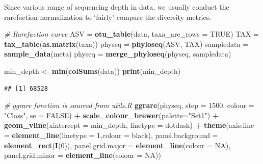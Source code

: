 \documentclass[
]{article}
\newenvironment{Shaded}{\begin{snugshade}}{\end{snugshade}}
\newcommand{\AttributeTok}[1]{\textcolor[rgb]{0.13,0.29,0.53}{#1}}
\newcommand{\CommentTok}[1]{\textcolor[rgb]{0.56,0.35,0.01}{\textit{#1}}}
\newcommand{\ConstantTok}[1]{\textcolor[rgb]{0.56,0.35,0.01}{#1}}
\newcommand{\DecValTok}[1]{\textcolor[rgb]{0.00,0.00,0.81}{#1}}
\newcommand{\FunctionTok}[1]{\textcolor[rgb]{0.13,0.29,0.53}{\textbf{#1}}}
\newcommand{\NormalTok}[1]{#1}
\newcommand{\OtherTok}[1]{\textcolor[rgb]{0.56,0.35,0.01}{#1}}
\newcommand{\SpecialCharTok}[1]{\textcolor[rgb]{0.81,0.36,0.00}{\textbf{#1}}}
\newcommand{\StringTok}[1]{\textcolor[rgb]{0.31,0.60,0.02}{#1}}
\begin{document}
Since various range of sequencing depth in data, we usually conduct the
rarefaction normalization to `fairly' compare the diversity metrics.

\begin{Shaded}
\begin{Highlighting}[]
\CommentTok{\# Rarefaction curve}
\NormalTok{ASV }\OtherTok{=} \FunctionTok{otu\_table}\NormalTok{(data, }\AttributeTok{taxa\_are\_rows =} \ConstantTok{TRUE}\NormalTok{)}
\NormalTok{TAX }\OtherTok{=} \FunctionTok{tax\_table}\NormalTok{(}\FunctionTok{as.matrix}\NormalTok{(taxa))}
\NormalTok{physeq }\OtherTok{=} \FunctionTok{phyloseq}\NormalTok{(ASV, TAX)}
\NormalTok{sampledata }\OtherTok{=} \FunctionTok{sample\_data}\NormalTok{(meta)}
\NormalTok{physeq }\OtherTok{=} \FunctionTok{merge\_phyloseq}\NormalTok{(physeq, sampledata)}

\NormalTok{min\_depth }\OtherTok{\textless{}{-}} \FunctionTok{min}\NormalTok{(}\FunctionTok{colSums}\NormalTok{(data))}
\FunctionTok{print}\NormalTok{(min\_depth)}
\end{Highlighting}
\end{Shaded}

\begin{verbatim}
## [1] 68528
\end{verbatim}

\begin{Shaded}
\begin{Highlighting}[]
\CommentTok{\# ggrare function is sourced from utils.R}
\FunctionTok{ggrare}\NormalTok{(physeq, }\AttributeTok{step =} \DecValTok{1500}\NormalTok{, }\AttributeTok{colour =} \StringTok{"Class"}\NormalTok{, }\AttributeTok{se =} \ConstantTok{FALSE}\NormalTok{) }\SpecialCharTok{+}
  \FunctionTok{scale\_colour\_brewer}\NormalTok{(}\AttributeTok{palette=}\StringTok{"Set1"}\NormalTok{) }\SpecialCharTok{+}
  \FunctionTok{geom\_vline}\NormalTok{(}\AttributeTok{xintercept =}\NormalTok{ min\_depth, }\AttributeTok{linetype =} \StringTok{\textquotesingle{}dotdash\textquotesingle{}}\NormalTok{) }\SpecialCharTok{+} 
  \FunctionTok{theme}\NormalTok{(}\AttributeTok{axis.line =} \FunctionTok{element\_line}\NormalTok{(}\AttributeTok{linetype =} \DecValTok{1}\NormalTok{,}\AttributeTok{colour =} \StringTok{\textquotesingle{}black\textquotesingle{}}\NormalTok{),}
  \AttributeTok{panel.background =} \FunctionTok{element\_rect}\NormalTok{(}\FunctionTok{I}\NormalTok{(}\DecValTok{0}\NormalTok{)),}
  \AttributeTok{panel.grid.major =} \FunctionTok{element\_line}\NormalTok{(}\AttributeTok{colour =} \ConstantTok{NA}\NormalTok{),}
  \AttributeTok{panel.grid.minor =} \FunctionTok{element\_line}\NormalTok{(}\AttributeTok{colour =} \ConstantTok{NA}\NormalTok{))}
\end{Highlighting}
\end{Shaded}
\end{document}
